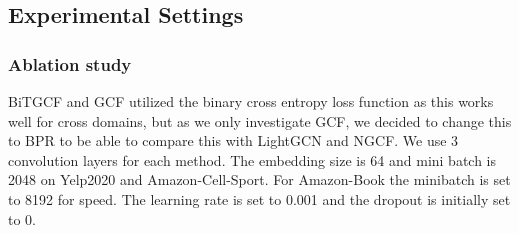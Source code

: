 \subsection{Experimental Settings}

\subsubsection{Ablation study}
BiTGCF and GCF utilized the binary cross entropy loss function as this works well for cross domains, but as we only investigate GCF, we decided to change this to BPR to be able to compare this with LightGCN and NGCF.
We use 3 convolution layers for each method.
The embedding size is 64 and mini batch is 2048 on Yelp2020 and Amazon-Cell-Sport.
For Amazon-Book the minibatch is set to 8192 for speed.
The learning rate is set to 0.001 and the dropout is initially set to 0.